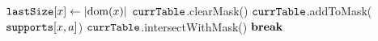     \label{line:updateTable:1} 
       \label{line:updateTable:2} 
        \STATE $\texttt{lastSize}[x] \leftarrow |\text{dom}({x})|$ \label{line:updateTable:3} 
        \STATE $\texttt{currTable}$.clearMask() \label{line:updateTable:4} 
         \label{line:updateTable:5} 
          \STATE $\texttt{currTable}$.addToMask($\texttt{supports}[x,a]$) \label{line:updateTable:6} 
        \ENDFOREACH      
        \STATE $\texttt{currTable}$.intersectWithMask() \label{line:updateTable:7} 
         \label{line:updateTable:8} 
          \STATE $\textbf{break~}$  \label{line:updateTable:9} 
        \ENDIF
      \ENDFOREACH
      \Endfunc
